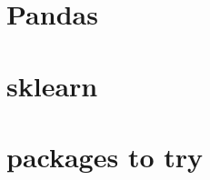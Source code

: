 \documentclass[11pt]{article}
\begin{document}
\section{Pandas}


\section{sklearn}

\begin{description}
  \setlength\itemsep{1pt}
  \item[Cross Validation:] 
\end{description}

\section{packages to try}

\begin{description}
  \setlength\itemsep{1pt}
  \item[text from PDFs:] 
\end{description}



\end{document}
